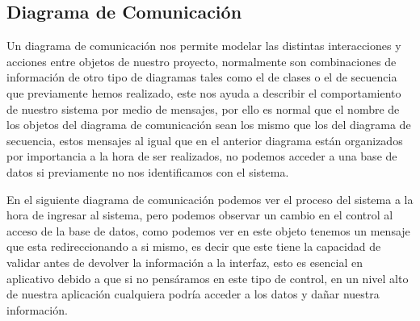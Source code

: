 \subsection{Diagrama de Comunicación}
Un diagrama de comunicación nos permite modelar las distintas interacciones y acciones entre objetos de nuestro proyecto, normalmente son combinaciones de información de otro tipo de diagramas tales como el de clases o el de secuencia que previamente hemos realizado, este nos ayuda a describir el comportamiento de nuestro sistema por medio de mensajes, por ello es normal que el nombre de los objetos del diagrama de comunicación sean los mismo que los del diagrama de secuencia, estos mensajes al igual que en el anterior diagrama están organizados por importancia a la hora de ser realizados, no podemos acceder a una base de datos si previamente no nos identificamos con el sistema.

En el siguiente diagrama de comunicación podemos ver el proceso del sistema a la hora de ingresar al sistema, pero podemos observar un cambio en el control  al acceso de la base de datos, como podemos ver en este objeto tenemos un mensaje que esta redireccionando a si mismo, es decir que este tiene la capacidad de validar antes de devolver la información a la interfaz, esto es esencial en aplicativo debido a que si no pensáramos en este tipo de control, en un nivel alto de nuestra aplicación cualquiera podría acceder a los datos y dañar nuestra información. 

